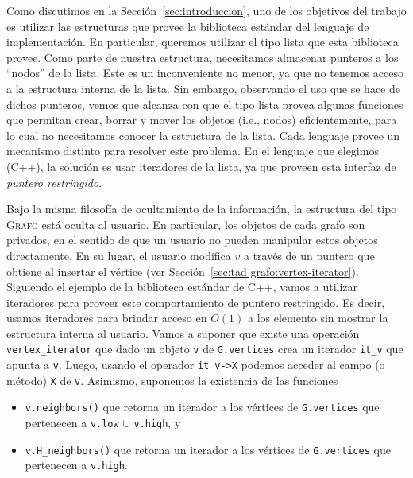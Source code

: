 \documentclass[%
    a4paper,%
    fontsize=12pt,%
    DIV=12,
    twoside,%
    openright,%
    titlepage=true,%
    headsepline,%
    toc=bibliography,%
    parskip=half,%
    cleardoublepage=empty,%
    headings=big,%
]{scrbook}
\makeatletter
\newcommand{\Grafo}{\textsc{Grafo}\xspace}
\newcommand{\Code}[2][]{\lstinline[basicstyle={\ttfamily},#1]@#2@}
\DeclareRobustCommand{\CPP}{C\nolinebreak[4]\hspace{-.05em}\raisebox{.4ex}{\relsize{-3}\textbf{++}}\xspace}
\def\CPP{C++}%
\makeatother
\begin{document}
Como discutimos en la Sección~\ref{sec:introduccion}, uno de los objetivos del trabajo es utilizar las estructuras que provee la biblioteca estándar del lenguaje de implementación.  En particular, queremos utilizar el tipo lista que esta biblioteca provee.  Como parte de nuestra estructura, necesitamos almacenar punteros a los ``nodos'' de la lista.  Este es un inconveniente no menor, ya que no tenemos acceso a la estructura interna de la lista.  Sin embargo, observando el uso que se hace de dichos punteros, vemos que alcanza con que el tipo lista provea algunas funciones que permitan crear, borrar y mover los objetos (i.e., nodos) eficientemente, para lo cual no necesitamos conocer la estructura de la lista.  Cada lenguaje provee un mecanismo distinto para resolver este problema.  En el lenguaje que elegimos (\CPP), la solución es usar iteradores de la lista, ya que proveen esta interfaz de \emph{puntero restringido}.  

Bajo la misma filosofía de ocultamiento de la información, la estructura del tipo \Grafo está oculta al usuario.  En particular, los objetos de cada grafo son privados, en el sentido de que un usuario no pueden manipular estos objetos directamente.  En su lugar, el usuario modifica $v$ a través de un puntero que obtiene al insertar el vértice (ver Sección~\ref{sec:tad grafo:vertex-iterator}).  Siguiendo el ejemplo de la biblioteca estándar de \CPP, vamos a utilizar iteradores para proveer este comportamiento de puntero restringido.  Es decir, usamos iteradores para brindar acceso en $O(1)$ a los elemento sin mostrar la estructura interna al usuario.  Vamos a suponer que existe una operación \Code{vertex_iterator} que dado un objeto \Code{v} de \Code{G.vertices} crea un iterador \Code{it_v} que apunta a \Code{v}.  Luego, usando el operador \Code{it_v->X} podemos acceder al campo (o método) \Code{X} de \Code{v}.  Asimismo, suponemos la existencia de las funciones
\begin{itemize}
  \item \Code{v.neighbors()} que retorna un iterador a los vértices de \Code{G.vertices} que pertenecen a \Code{v.low} $\cup$ \Code{v.high}, y 
  \item \Code{v.H_neighbors()} que retorna un iterador a los vértices de \Code{G.vertices} que pertenecen a \Code{v.high}.
\end{itemize}
\end{document}
